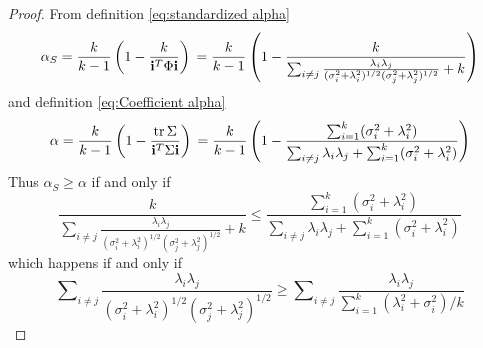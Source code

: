 \documentclass[twoside]{article}
\DeclareMathOperator{\tr}{tr}
\DeclareMathOperator{\tsum}{\textstyle \sum}
\renewcommand{\sqrt}[1]{{(#1)^{1/2}}}
\begin{document}
\begin{proof}
From definition \eqref{eq:standardized alpha}
\begin{equation*}
\alpha_S = \frac{k}{k-1}\left(1-\frac{k}{\mathbf{i}^{T}\Phi\mathbf{i}}\right)\\
 = \frac{k}{k-1}\left(1-\frac{k}{\tsum_{i\neq j}\frac{\lambda_{i}\lambda_{j}}{\sqrt{\sigma_{i}^{2}+\lambda_{i}^{2}}\sqrt{\sigma_{j}^{2}+\lambda_{j}^{2}}}+k}\right)
\end{equation*}
and definition \eqref{eq:Coefficient alpha}
\begin{equation*}
\alpha = \frac{k}{k-1}\left(1-\frac{\tr\Sigma}{\mathbf{i}^{T}\Sigma\mathbf{i}}\right)\\
 = \frac{k}{k-1}\left(1-\frac{\tsum_{i=1}^{k}(\sigma_{i}^{2}+\lambda_{i}^{2})}{\tsum_{i\neq j}\lambda_{i}\lambda_{j}+\tsum_{i=1}^{k}(\sigma_{i}^{2}+\lambda_{i}^{2})}\right)
\end{equation*}
Thus $\alpha_S\geq\alpha$ if and only if
\[
\frac{k}{\tsum_{i\neq j}\frac{\lambda_{i}\lambda_{j}}{\sqrt{\sigma_{i}^{2}+\lambda_{i}^{2}}\sqrt{\sigma_{j}^{2}+\lambda_{j}^{2}}}+k}\leq\frac{\tsum_{i=1}^{k}(\sigma_{i}^{2}+\lambda_{i}^{2})}{\tsum_{i\neq j}\lambda_{i}\lambda_{j}+\tsum_{i=1}^{k}(\sigma_{i}^{2}+\lambda_{i}^{2})}
\]
which happens if and only if 
\[
\tsum_{i\neq j}\frac{\lambda_{i}\lambda_{j}}{\sqrt{\sigma_{i}^{2}+\lambda_{i}^{2}}\sqrt{\sigma_j^{2}+\lambda_{j}^{2}}}\geq\tsum_{i\neq j}\frac{\lambda_{i}\lambda_{j}}{\tsum_{i=1}^{k}(\lambda_{i}^{2}+\sigma_{i}^{2})/k}
\]
\end{proof}
\end{document}
